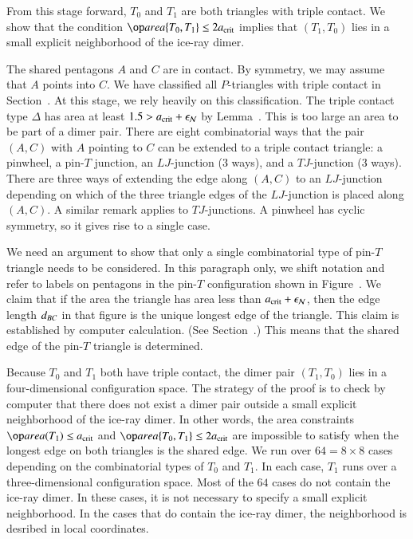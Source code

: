 From this stage forward, $T_0$ and $T_1$ are both triangles with
triple contact.  We show that the condition $\area\{T_0,T_1\}\le
2\acrit$ implies that $(T_1,T_0)$ lies in a small explicit
neighborhood of the ice-ray dimer.

The shared pentagons $A$ and $C$ are in contact.  By symmetry, we may
assume that $A$ points into $C$.  We have classified all $P$-triangles
with triple contact in Section~.  At this stage, we
rely heavily on this classification.  The triple contact type $\Delta$
has area at least $1.5 > a_\text{crit}+\epsilon_{\mathcal N}$ by Lemma~.
This is too large an area to be part of a dimer pair.  There are eight
combinatorial ways that the pair $(A,C)$ with $A$ pointing to $C$ can
be extended to a triple contact triangle: a pinwheel, a pin-$T$
junction, an $LJ$-junction (3 ways), and a $TJ$-junction (3 ways).
There are three ways of extending the edge along $(A,C)$ to an
$LJ$-junction depending on which of the three triangle edges of the
$LJ$-junction is placed along $(A,C)$.  A similar remark applies to
$TJ$-junctions.  A pinwheel has cyclic symmetry, so it gives rise to a
single case.

We need an argument to show that only a single combinatorial type of
pin-$T$ triangle needs to be considered.  In this paragraph only, we
shift notation and refer to labels on pentagons in the pin-$T$
configuration shown in Figure~.  We claim that if
the area the triangle has area less than $a_\text{crit}+\epsilon_{\mathcal N}$, then the edge
length $d_{BC}$ in that figure is the unique longest edge of the
triangle.  This claim is established by computer calculation.  (See
Section~.)  This means that the shared edge of the
pin-$T$ triangle is determined.

Because $T_0$ and $T_1$ both have triple contact, the dimer pair
$(T_1,T_0)$ lies in a four-dimensional configuration space.  The
strategy of the proof is to check by computer that there does not
exist a dimer pair outside a small explicit neighborhood of the
ice-ray dimer.  In other words, the area constraints $\area(T_1)\le
\acrit$ and $\area\{T_0,T_1\}\le2\acrit$ are impossible to satisfy
when the longest edge on both triangles is the shared edge.  We run
over $64 = 8\times 8$ cases depending on the combinatorial types of
$T_0$ and $T_1$.  In each case, $T_1$ runs over a three-dimensional
configuration space.  Most of the $64$ cases do not contain the
ice-ray dimer.  In these cases, it is not necessary to specify a small
explicit neighborhood.  In the cases that do contain the ice-ray
dimer, the neighborhood is desribed in local coordinates.

